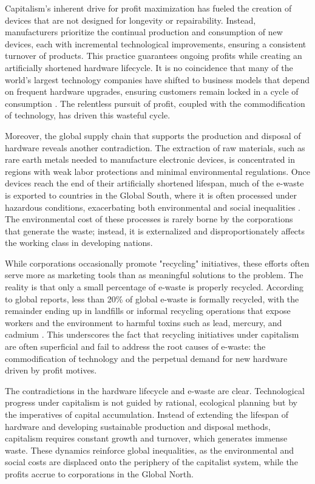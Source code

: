 \begin{refsection}
Capitalism's inherent drive for profit maximization has fueled the creation of devices that are not designed for longevity or repairability. Instead, manufacturers prioritize the continual production and consumption of new devices, each with incremental technological improvements, ensuring a consistent turnover of products. This practice guarantees ongoing profits while creating an artificially shortened hardware lifecycle. It is no coincidence that many of the world's largest technology companies have shifted to business models that depend on frequent hardware upgrades, ensuring customers remain locked in a cycle of consumption \cite[pp.~101-102]{maxwell2012}. The relentless pursuit of profit, coupled with the commodification of technology, has driven this wasteful cycle.

Moreover, the global supply chain that supports the production and disposal of hardware reveals another contradiction. The extraction of raw materials, such as rare earth metals needed to manufacture electronic devices, is concentrated in regions with weak labor protections and minimal environmental regulations. Once devices reach the end of their artificially shortened lifespan, much of the e-waste is exported to countries in the Global South, where it is often processed under hazardous conditions, exacerbating both environmental and social inequalities \cite[pp.~31-32]{heacock2016}. The environmental cost of these processes is rarely borne by the corporations that generate the waste; instead, it is externalized and disproportionately affects the working class in developing nations.

While corporations occasionally promote "recycling" initiatives, these efforts often serve more as marketing tools than as meaningful solutions to the problem. The reality is that only a small percentage of e-waste is properly recycled. According to global reports, less than 20\% of global e-waste is formally recycled, with the remainder ending up in landfills or informal recycling operations that expose workers and the environment to harmful toxins such as lead, mercury, and cadmium \cite[pp.~10-11]{forti2020}. This underscores the fact that recycling initiatives under capitalism are often superficial and fail to address the root causes of e-waste: the commodification of technology and the perpetual demand for new hardware driven by profit motives.

The contradictions in the hardware lifecycle and e-waste are clear. Technological progress under capitalism is not guided by rational, ecological planning but by the imperatives of capital accumulation. Instead of extending the lifespan of hardware and developing sustainable production and disposal methods, capitalism requires constant growth and turnover, which generates immense waste. These dynamics reinforce global inequalities, as the environmental and social costs are displaced onto the periphery of the capitalist system, while the profits accrue to corporations in the Global North.


\end{refsection}
